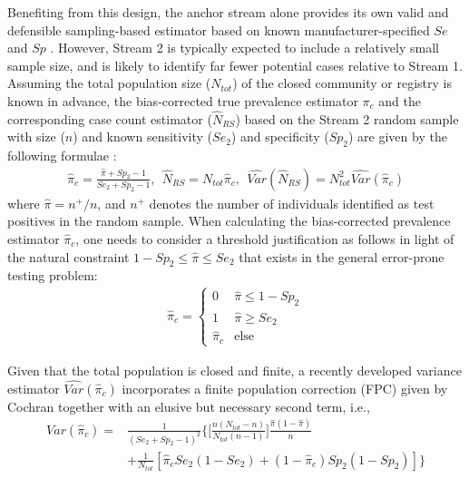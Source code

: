 \documentclass[useAMS,usenatbib,referee]{biom}
\begin{document}
Benefiting from this design, the anchor stream alone provides its own valid and defensible sampling-based estimator based on known manufacturer-specified $Se$ and $Sp$ \citep{Ge2023b}. However, Stream 2 is typically expected to include a relatively small sample size, and is likely to identify far fewer potential cases relative to Stream 1. Assuming the total population size ($N_{tot}$) of the closed community or registry is known in advance, the bias-corrected true prevalence estimator $\pi_c$ and the corresponding case count estimator ($\hat{N}_{RS}$) based on the Stream 2 random sample with size ($n$) and known sensitivity ($Se_2$) and specificity ($Sp_2$) are given by the following formulae \citep{Rogan1978,Gastwirth1987,Levy1970,Ge2023b}: 
\begin{align}
    \hat{\pi}_c = \frac{\hat{\pi}+Sp_2-1}{Se_2+Sp_2-1}, ~~ \hat{N}_{RS}=N_{tot}\hat{\pi}_c, ~~ \hat{Var}(\hat{N}_{RS}) = N_{tot}^2\hat{Var}(\hat{\pi}_c) \label{eq_3.1}
\end{align}
where $\hat{\pi}=n^+/n$, and $n^+$ denotes the number of individuals identified as test positives in the random sample. When calculating the bias-corrected prevalence estimator $\hat{\pi}_c$, one needs to consider a threshold justification as follows \citep{Ge2023b} in light of the natural constraint $1-Sp_2\leq \hat{\pi}\leq Se_2$ that exists in the general error-prone testing problem:
\begin{align}
    \hat{\pi}_c = 
     \begin{cases}
      0 & \hat{\pi}\leq 1-Sp_2 \\
      1 & \hat{\pi}\geq Se_2   \\
      \hat{\pi}_c & \text{else}
    \end{cases}     
\end{align}

Given that the total population is closed and finite, a recently developed variance estimator $\hat{Var}(\hat{\pi}_c)$ \citep{Ge2023b} incorporates a finite population correction (FPC) given by Cochran \citep{Cochran1977} together with an elusive but necessary second term, i.e.,
\begin{align}\label{eq_3}
    \hat{Var}(\hat{\pi}_c) =& \frac{1}{(Se_2+Sp_2-1)^2}\big\{ \big[\frac{n(N_{tot}-n)}{N_{tot}(n-1)} \big] \frac{\hat{\pi}(1-\hat{\pi})}{n} \nonumber\\
    &+ \frac{1}{N_{tot}}[\hat{\pi}_c Se_2(1-Se_2)+(1-\hat{\pi}_c)Sp_2(1-Sp_2)]\big\}
\end{align}
\end{document}
